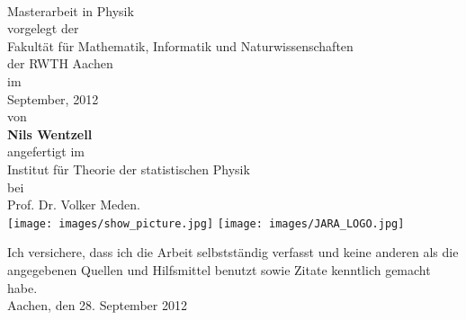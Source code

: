 \begin{titlepage}
\begin{center}
\\[14ex]
\Large

Masterarbeit in Physik\\[0.5ex] vorgelegt der \\[0.5ex] Fakult\"at f\"ur Mathematik, Informatik und Naturwissenschaften\\[0.5ex] der RWTH Aachen\\[8ex]
im\\[2ex]
September, 2012\\[5ex]
von\\[2ex]
{\bfseries Nils Wentzell}\\[10ex]
angefertigt im\\[2ex]
Institut f\"ur Theorie der statistischen Physik\\[2ex]
bei\\[2ex]
Prof. Dr. Volker Meden.\\[6ex]
\texttt{[image: images/show\_picture.jpg]} \hspace{0.1\linewidth}
\texttt{[image: images/JARA\_LOGO.jpg]}
\end{center}

\newpage
\thispagestyle{empty}
Ich versichere, dass ich die Arbeit selbstst\"andig verfasst und keine anderen als die angegebenen Quellen und Hilfsmittel benutzt sowie Zitate kenntlich gemacht habe.\\[4ex]
Aachen, den 28. September 2012	

\setlength{\parindent}{2ex}
\end{titlepage}
